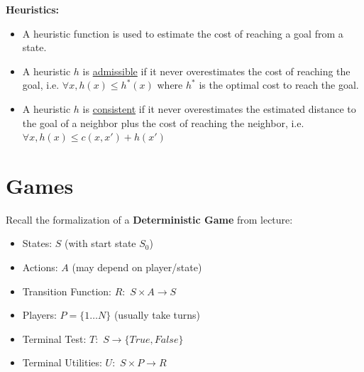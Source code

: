 \documentclass[a4paper]{article}
\begin{document}
\textbf{Heuristics:}
\begin{itemize}
\item A heuristic function is used to estimate the cost of reaching a goal from a state.
\item A heuristic $h$ is \underline{admissible} if it never overestimates the cost of reaching the goal, i.e. $\forall x, h(x) \le h^*(x)$ where $h^*$ is the optimal cost to reach the goal.
\item A heuristic $h$ is \underline{consistent} if it never overestimates the estimated distance to the goal of a neighbor plus the cost of reaching the neighbor, i.e. $\forall x, h(x) \le c(x, x') + h(x')$
\end{itemize}

\section{Games}
\noindent Recall the formalization of a \textbf{Deterministic Game} from lecture:
\begin{itemize}
\setlength\itemsep{0.2em}
\item States: $S$ (with start state $S_0$)
\item Actions: $A$ (may depend on player/state)
\item Transition Function: $R:$ $S \times A \rightarrow S$
\item Players: $P=\{1 \ldots N\}$ (usually take turns)
\item Terminal Test: $T:$ $S \rightarrow \{True,False\}$
\item Terminal Utilities: $U:$ $S \times P \rightarrow R$
\end{itemize}
\end{document}
